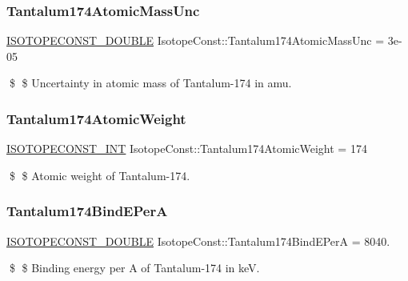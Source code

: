 \subsubsection{\texorpdfstring{Tantalum174\+Atomic\+Mass\+Unc}{Tantalum174AtomicMassUnc}}
{\footnotesize\ttfamily \mbox{\hyperlink{group___isotope_const-_macros_ga8f45a7272ce02c0b4c65c44636ed719a}{I\+S\+O\+T\+O\+P\+E\+C\+O\+N\+S\+T\+\_\+\+D\+O\+U\+B\+LE}} Isotope\+Const\+::\+Tantalum174\+Atomic\+Mass\+Unc = 3e-\/05}

\$ \$ Uncertainty in atomic mass of Tantalum-\/174 in amu. \mbox{\label{group___isotope_const-_tantalum-_ta174_gaeb0d38a351c8b9e22127a6ea1353c285}} 
\subsubsection{\texorpdfstring{Tantalum174\+Atomic\+Weight}{Tantalum174AtomicWeight}}
{\footnotesize\ttfamily \mbox{\hyperlink{group___isotope_const-_macros_ga5f18360b3e99483a35c32d789e62621c}{I\+S\+O\+T\+O\+P\+E\+C\+O\+N\+S\+T\+\_\+\+I\+NT}} Isotope\+Const\+::\+Tantalum174\+Atomic\+Weight = 174}

\$ \$ Atomic weight of Tantalum-\/174. \mbox{\label{group___isotope_const-_tantalum-_ta174_ga652e6a0aa43050764949f6c5eb846e7b}} 
\subsubsection{\texorpdfstring{Tantalum174\+Bind\+E\+PerA}{Tantalum174BindEPerA}}
{\footnotesize\ttfamily \mbox{\hyperlink{group___isotope_const-_macros_ga8f45a7272ce02c0b4c65c44636ed719a}{I\+S\+O\+T\+O\+P\+E\+C\+O\+N\+S\+T\+\_\+\+D\+O\+U\+B\+LE}} Isotope\+Const\+::\+Tantalum174\+Bind\+E\+PerA = 8040.}

\$ \$ Binding energy per A of Tantalum-\/174 in keV. \mbox{\label{group___isotope_const-_tantalum-_ta174_ga3a624d4ad81480c9a4b4a045b59c18c0}} 
